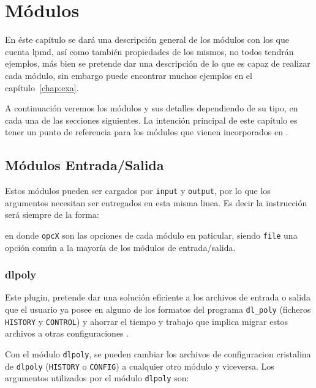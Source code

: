\chapter{M\'odulos}
\label{chap:modulos}

En \'este cap\'itulo se dar\'a una descripci\'on general de los m\'odulos con los que cuenta lpmd, as\'i como tambi\'en propiedades de los mismos, no todos tendr\'an ejemplos, m\'as bien se pretende dar una descripci\'on de lo que es capaz de realizar cada m\'odulo, sin embargo puede encontrar muchos ejemplos en el cap\'itulo~\ref{chap:exa}.

A continuaci\'on veremos los m\'odulos y sus detalles dependiendo de su tipo, en cada una de las secciones siguientes. La intenci\'on principal de este cap\'itulo es tener un punto de referencia para los m\'odulos que vienen incorporados en {\lpmd}.

\section{M\'odulos Entrada/Salida}
\label{chap:modulos:entradasalida}
Estos m\'odulos pueden ser cargados por \verb|input| y \verb|output|, por lo que los argumentos necesitan ser entregados en esta misma linea. Es decir la instrucci\'on ser\'a siempre de la forma:


en donde \verb|opcX| son las opciones de cada m\'odulo en paticular, siendo \verb|file| una opci\'on com\'un a la mayor\'ia de los m\'odulos de entrada/salida.

\subsection{dlpoly}
Este plugin, pretende dar una soluci\'on eficiente a los archivos de entrada o salida que el usuario ya posee en alguno de los formatos del programa \verb|dl_poly| (ficheros \verb|HISTORY| y \verb|CONTROL|) y ahorrar el tiempo y trabajo que implica migrar estos archivos a otras configuraciones .

Con el m\'odulo \verb|dlpoly|, se pueden cambiar los archivos de configuracion cristalina de \verb|dlpoly| (\verb|HISTORY| o \verb|CONFIG|) a cualquier otro m\'odulo y viceversa. Los argumentos utilizados por el m\'odulo \verb|dlpoly| son:


